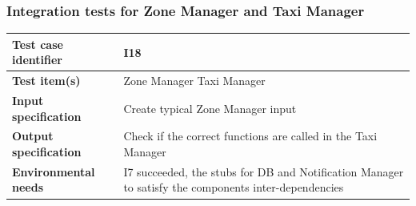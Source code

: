 \documentclass[a4paper,11pt]{report} %
\begin{document}
		\subsubsection{Integration tests for Zone Manager and Taxi Manager} \label{sec:3.1.15}
			\begin{minipage}{\linewidth}
			\end{minipage}		
		\begin{center}
			\renewcommand{\arraystretch}{1.2}
			\setlength{\tabcolsep}{24pt}
			\begin{tabular}{ l  p{9cm}}\hline
				\textbf{Test case identifier} & I18\\\hline
				\textbf{Test item(s)} & Zone Manager \textrightarrow Taxi Manager\\\hline
				\textbf{Input specification} & Create typical Zone Manager input \\\hline
				\textbf{Output specification} & Check if the correct functions are called in the Taxi Manager\\\hline
				\textbf{Environmental needs} &  I7 succeeded, the stubs for DB and Notification Manager to satisfy the components inter-dependencies\\\hline
			\end{tabular}
		\end{center}
		
		\pagebreak		
\end{document}
